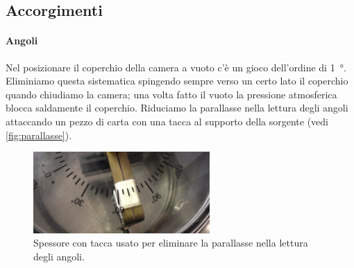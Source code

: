 \subsection{Accorgimenti}

\paragraph{Angoli}
\label{spiegazione}

Nel posizionare il coperchio della camera a vuoto c'è un gioco dell'ordine di \SI{1}{\degree}.
Eliminiamo questa sistematica spingendo sempre verso un certo lato il coperchio quando chiudiamo la camera;
una volta fatto il vuoto la pressione atmosferica blocca saldamente il coperchio.
Riduciamo la parallasse nella lettura degli angoli
attaccando un pezzo di carta con una tacca al supporto della sorgente (vedi \autoref{fig:parallasse}).

\begin{figure}
	\centering
	\includegraphics[width=0.6\textwidth]{immagini/parallasse}
	\caption{\label{fig:parallasse}
	Spessore con tacca usato per eliminare la parallasse nella lettura degli angoli.}
\end{figure}


